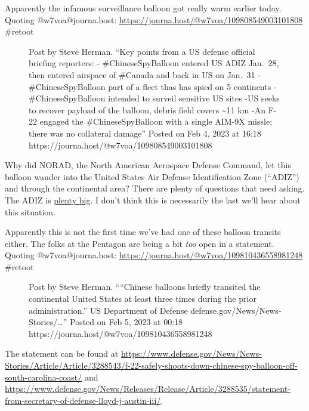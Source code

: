 Apparently the infamous surveillance balloon got really warm earlier
today. Quoting @w7voa@journa.host:
\url{https://journa.host/@w7voa/109808549003101808} \#retoot

\begin{figure}
\centering
{}
\caption{Post by Steve Herman. ``Key points from a US defense official
briefing reporters: - \#ChineseSpyBalloon entered US ADIZ Jan.~28, then
entered airspace of \#Canada and back in US on Jan.~31
-\#ChineseSpyBalloon part of a fleet thas has spied on 5 continents
-\#ChineseSpyBalloon intended to surveil sensitive US sites -US seeks to
recover payload of the balloon, debris field covers \textasciitilde11 km
-An F-22 engaged the \#ChineseSpyBalloon with a single AIM-9X missle;
there was no collateral damage'' Posted on Feb 4, 2023 at 16:18
https://journa.host/@w7voa/109808549003101808}
\end{figure}

Why did NORAD, the North American Aerospace Defense Command, let this
balloon wander into the United States Air Defense Identification Zone
(``ADIZ'') and through the continental area? There are plenty of
questions that need asking. The ADIZ is
\href{https://en.wikipedia.org/w/index.php?title=Air_Defense_Identification_Zone_(North_America)&oldid=1130570264}{plenty
big}. I don't think this is necessarily the last we'll hear about this
situation.

Apparently this is not the first time we've had one of these balloon
transits either. The folks at the Pentagon are being a bit \emph{too}
open in a statement. Quoting @w7voa@journa.host:
\url{https://journa.host/@w7voa/109810436558981248} \#retoot

\begin{figure}
\centering
{}
\caption{Post by Steve Herman. ````Chinese balloons briefly transited
the continental United States at least three times during the prior
administration.'' US Department of Defense
defense.gov/News/News-Stories/\ldots'' Posted on Feb 5, 2023 at 00:18
https://journa.host/@w7voa/109810436558981248}
\end{figure}

The statement can be found at
\url{https://www.defense.gov/News/News-Stories/Article/Article/3288543/f-22-safely-shoots-down-chinese-spy-balloon-off-south-carolina-coast/}
and
\url{https://www.defense.gov/News/Releases/Release/Article/3288535/statement-from-secretary-of-defense-lloyd-j-austin-iii/}.
